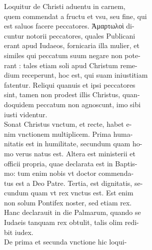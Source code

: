 \documentclass{article}
\begin{document}
\begin{pages}
                Loquitur de Christi aduentu in carnem, \\
                quem commendat a fructu et vsu, seu fine, qui \\
                est saluos facere peccatores. Ἁμαρτωλοὶ di- \\
                cuntur notorii peccatores, quales Publicani \\
                erant apud Iudaeos, fornicaria illa mulier, et \\
                similes qui peccatum suum negare non pote- \\
                rant : tales etiam soli apud Christum reme- \\
                dium receperunt, hoc est, qui suam iniustitiam \\
                fatentur. Reliqui quanuis et ipsi peccatores \\
                sint, tamen non prodest illis Christus, quan- \\
                doquidem peccatum non agnoscunt, imo sibi \\
                iusti videntur. \\
                Sonat Christus vnctum, et recte, habet e- \\
                nim vnctionem multiplicem. Prima huma- \\
                nitatis est in humilitate, secundum quam ho- \\
                mo verus natus est. Altera est ministerii et \\
                officii propria, quae declarata est in Baptis- \\
                mo: tum enim nobis vt doctor commenda- \\
                tus est a Deo Patre. Tertia, est dignitatis, se- \\
                cundum quam vt rex vnctus est. Est enim \\
                non solum Pontifex noster, sed etiam rex. \\
                Hanc declarauit in die Palmarum, quando se \\
                Iudaeis tanquam rex obtulit, talis olim redi- \\
                bit iudex. \\
                De prima et secunda vnctione hic loqui- \\

\end{pages}
\end{document}
